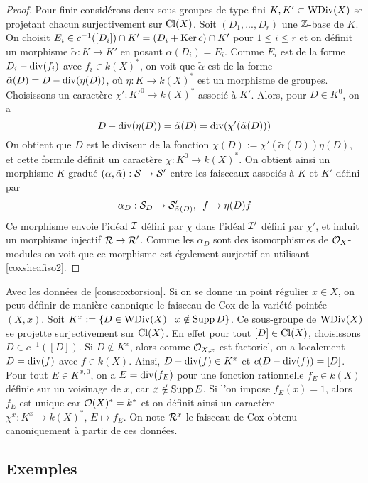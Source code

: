 \begin{proof}
Pour finir considérons deux sous-groupes de type fini $K,K'\subset \operatorname{WDiv}(X)$ se projetant chacun surjectivement sur $\operatorname{Cl}(X)$. Soit $(D_1,...,D_r)$ une $\mathbb{Z}$-base de $K$. On choisit $E_i\in c^{-1}([D_i])\cap K'=(D_i+\operatorname{Ker} c)\cap K'$ pour $1\leq i\leq r$ et on définit un morphisme $\tilde{\alpha}:K\rightarrow K'$ en posant $\alpha(D_i)=E_i$. Comme $E_i$ est de la forme $D_i-\operatorname{div}(f_i)$ avec $f_i\in k(X)^*$, on voit que $\tilde{\alpha}$ est de la forme $\tilde{\alpha}(D)=D-\operatorname{div}(\eta(D))$, où $\eta:K\rightarrow k(X)^*$ est un morphisme de groupes. Choisissons un caractère $\chi':K'^0\rightarrow k(X)^*$ associé à $K'$. Alors, pour $D\in K^0$, on a
$$D-\operatorname{div}(\eta(D))=\tilde{\alpha}(D)=\operatorname{div}(\chi'(\tilde{\alpha}(D)))$$
On obtient que $D$ est le diviseur de la fonction $\chi(D):=\chi'(\tilde{\alpha}(D))\eta(D)$, et cette formule définit un caractère $\chi:K^0\rightarrow k(X)^*$. On obtient ainsi un morphisme $K$-gradué $(\alpha,\tilde{\alpha}):\mathcal{S}\rightarrow \mathcal{S}'$ entre les faisceaux associés à $K$ et $K'$ défini par
$$\alpha_D:\mathcal{S}_D\rightarrow \mathcal{S}'_{\tilde{\alpha}(D)},\,\,\, f\mapsto\eta(D)f$$
Ce morphisme envoie l'idéal $\mathcal{I}$ défini par $\chi$ dans l'idéal $\mathcal{I}'$ défini par $\chi'$, et induit un morphisme injectif $\mathcal{R}\rightarrow \mathcal{R}'$. Comme les $\alpha_D$ sont des isomorphismes de $\mathcal{O}_X$-modules on voit que ce morphisme est également surjectif en utilisant \ref{coxsheafiso2}.
\end{proof}

\begin{rem}
Avec les données de \ref{conscoxtorsion}. Si on se donne un point régulier $x\in X$, on peut définir de manière canonique le faisceau de Cox de la variété pointée $(X, x)$. Soit $K^x:=\lbrace D\in\operatorname{WDiv}(X)\mid x\notin \operatorname{Supp} D\rbrace$.  Ce sous-groupe de $\operatorname{WDiv}(X)$ se projette surjectivement sur $\operatorname{Cl}(X)$. En effet pour tout $[D]\in \operatorname{Cl}(X)$, choisissons $D\in c^{-1}([D])$. Si $D\notin K^x$, alors comme $\mathcal{O}_{X,x}$ est factoriel, on a localement $D=\operatorname{div}(f)$ avec $f\in k(X)$. Ainsi, $D-\operatorname{div}(f)\in K^x$ et $c(D-\operatorname{div}(f)) =[D]$. Pour tout $E\in K^{x,0}$, on a $E=\operatorname{div}(f_E)$ pour une fonction rationnelle $f_E\in k(X)$ définie sur un voisinage de $x$, car $x\notin \operatorname{Supp} E$. Si l'on impose $f_E(x)=1$, alors $f_E$ est unique car $\mathcal{O}(X)^*=k^*$ et on définit ainsi un caractère $\chi^x:K^x\rightarrow k(X)^*,\,E\mapsto f_E$. On note $\mathcal{R}^x$ le faisceau de Cox obtenu canoniquement à partir de ces données.
\end{rem}

\subsection{Exemples}

